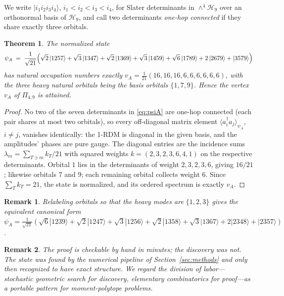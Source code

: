\documentclass[11pt]{article}
\newtheorem{theorem}{Theorem}
\newtheorem{remark}{Remark}
\newcommand{\wedgeN}[2]{\wedge^{#1}\mathcal{H}_{#2}}
\newcommand{\ket}[1]{|#1\rangle}
\begin{document}
We write $\ket{i_1 i_2 i_3 i_4}$, $i_1<i_2<i_3<i_4$, for Slater determinants
in $\wedgeN{4}{9}$ over an orthonormal basis of $\mathcal{H}_9$, and call two
determinants \emph{one-hop connected} if they share exactly three orbitals.

\begin{theorem}
\label{thm:psiA}
The normalized state
\begin{equation}
\label{eq:psiA}
\psi_A \;=\; \frac{1}{\sqrt{21}}\Bigl(
\sqrt{2}\,\ket{1257} + \sqrt{3}\,\ket{1347} + \sqrt{2}\,\ket{1369}
+ \sqrt{3}\,\ket{1459} + \sqrt{6}\,\ket{1789} + 2\,\ket{2679} + \ket{3579}
\Bigr)
\end{equation}
has natural occupation numbers exactly
$v_A = \tfrac1{21}(16,16,16,6,6,6,6,6,6)$, with the three heavy natural
orbitals being the basis orbitals $\{1,7,9\}$. Hence the vertex $v_A$ of
$\Pi_{4,9}$ is attained.
\end{theorem}

\begin{proof}
No two of the seven determinants in \eqref{eq:psiA} are one-hop connected
(each pair shares at most two orbitals), so every off-diagonal matrix
element $\langle a_i^\dagger a_j\rangle_{\psi_A}$, $i\neq j$, vanishes
identically: the 1-RDM is diagonal in the given basis, and the amplitudes'
phases are pure gauge. The diagonal entries are the incidence sums
$\lambda_m = \sum_{T \ni m} k_T/21$ with squared weights
$k = (2,3,2,3,6,4,1)$ on the respective determinants. Orbital $1$ lies in
the determinants of weight $2,3,2,3,6$, giving $16/21$; likewise orbitals
$7$ and $9$; each remaining orbital collects weight $6$. Since
$\sum_T k_T = 21$, the state is normalized, and its ordered spectrum is
exactly $v_A$.
\end{proof}

\begin{remark}
Relabeling orbitals so that the heavy modes are $\{1,2,3\}$ gives the
equivalent canonical form
$\psi_A = \tfrac1{\sqrt{21}}(\sqrt6\ket{1239} + \sqrt2\ket{1247}
+ \sqrt3\ket{1256} + \sqrt2\ket{1358} + \sqrt3\ket{1367}
+ 2\ket{2348} + \ket{2357})$.
\end{remark}

\begin{remark}
The proof is checkable by hand in minutes; the discovery was not. The state
was found by the numerical pipeline of Section~\ref{sec:methods} and only
then recognized to have exact structure. We regard the division of labor---
stochastic geometric search for discovery, elementary combinatorics for
proof---as a portable pattern for moment-polytope problems.
\end{remark}
\end{document}
